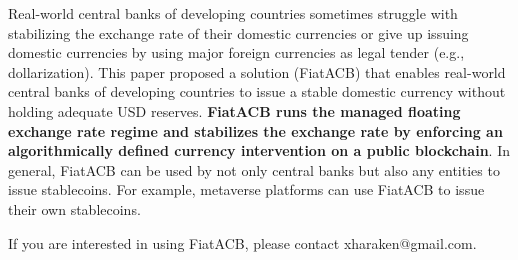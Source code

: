 \documentclass[dvipdfmx,a4paper]{article}
\begin{document}
Real-world central banks of developing countries sometimes struggle with stabilizing the exchange rate of their domestic currencies or give up issuing domestic currencies by using major foreign currencies as legal tender (e.g., dollarization). This paper proposed a solution (FiatACB) that enables real-world central banks of developing countries to issue a stable domestic currency without holding adequate USD reserves. \textbf{FiatACB runs the managed floating exchange rate regime and stabilizes the exchange rate by enforcing an algorithmically defined currency intervention on a public blockchain}. In general, FiatACB can be used by not only central banks but also any entities to issue stablecoins. For example, metaverse platforms can use FiatACB to issue their own stablecoins.

If you are interested in using FiatACB, please contact xharaken@gmail.com.



\end{document}
